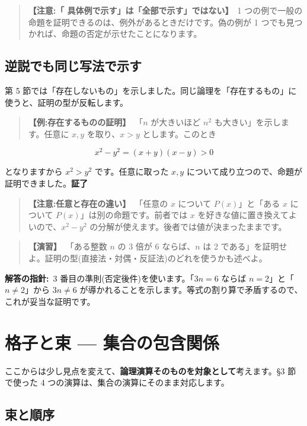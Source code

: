 \documentclass{article}
\begin{document}
\begin{quote}
\textbf{【注意:「 具体例で示す」は「全部で示す」ではない】}\ 1 つの例で一般の命題を証明できるのは、例外があるときだけです。偽の例が 1 つでも見つかれば、命題の否定が示せたことになります。
\end{quote}

\subsection{逆説でも同じ写法で示す}

第 5 節では「存在しないもの」を示しました。同じ論理を「存在するもの」に使うと、証明の型が反転します。

\begin{quote}
\textbf{【例:存在するものの証明】}\ 「\(n\) が大きいほど \(n^2\) も大きい」を示します。任意に \(x, y\) を取り、\(x > y\) とします。このとき
\end{quote}

\[ x^2 - y^2 = (x + y)(x - y) > 0 \]

となりますから \(x^2 > y^2\) です。任意に取った \(x, y\) について成り立つので、命題が証明できました。\textbf{証了}

\begin{quote}
\textbf{【注意:任意と存在の違い】}\ 「任意の \(x\) について \(P(x)\)」と「ある \(x\) について \(P(x)\)」は別の命題です。前者では \(x\) を好きな値に置き換えてよいので、\(x^2 - y^2\) の分解が使えます。後者では値が決まったままです。
\end{quote}

\begin{quote}
\textbf{【演習】}\ 「ある整数 \(n\) の 3 倍が 6 ならば、\(n\) は 2 である」を証明せよ。証明の型(直接法・対偶・反証法)のどれを使うかも述べよ。
\end{quote}

\textbf{解答の指針:}\ 3 番目の準則(否定後件)を使います。「\(3n = 6\) ならば \(n = 2\)」と「\(n \neq 2\)」から \(3n \neq 6\) が導かれることを示します。等式の割り算で矛盾するので、これが妥当な証明です。

\section{格子と束 — 集合の包含関係}

ここからは少し見点を変えて、\textbf{論理演算そのものを対象として}考えます。§3 節で使った 4 つの演算は、集合の演算にそのまま対応します。

\subsection{束と順序}
\end{document}

